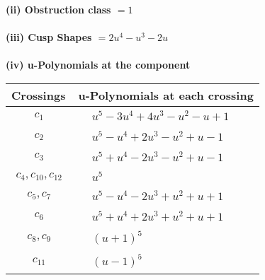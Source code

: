 \documentclass[1p]{elsarticle_modified}
\theoremstyle{definition}
\begin{document}
\flushleft \textbf{(ii) Obstruction class $= 1$}\\~\\
\flushleft \textbf{(iii) Cusp Shapes $= 2 u^4- u^3-2 u$}\\~\\
\newpage\renewcommand{\arraystretch}{1}
\flushleft \textbf{(iv) u-Polynomials at the component}\newline \\
\begin{tabular}{m{50pt}|m{274pt}}
Crossings & \hspace{64pt}u-Polynomials at each crossing \\
\hline $$\begin{aligned}c_{1}\end{aligned}$$&$\begin{aligned}
&u^5-3 u^4+4 u^3- u^2- u+1
\end{aligned}$\\
\hline $$\begin{aligned}c_{2}\end{aligned}$$&$\begin{aligned}
&u^5- u^4+2 u^3- u^2+u-1
\end{aligned}$\\
\hline $$\begin{aligned}c_{3}\end{aligned}$$&$\begin{aligned}
&u^5+u^4-2 u^3- u^2+u-1
\end{aligned}$\\
\hline $$\begin{aligned}c_{4},c_{10},c_{12}\end{aligned}$$&$\begin{aligned}
&u^5
\end{aligned}$\\
\hline $$\begin{aligned}c_{5},c_{7}\end{aligned}$$&$\begin{aligned}
&u^5- u^4-2 u^3+u^2+u+1
\end{aligned}$\\
\hline $$\begin{aligned}c_{6}\end{aligned}$$&$\begin{aligned}
&u^5+u^4+2 u^3+u^2+u+1
\end{aligned}$\\
\hline $$\begin{aligned}c_{8},c_{9}\end{aligned}$$&$\begin{aligned}
&(u+1)^5
\end{aligned}$\\
\hline $$\begin{aligned}c_{11}\end{aligned}$$&$\begin{aligned}
&(u-1)^5
\end{aligned}$\\
\hline
\end{tabular}\\~\\
\end{document}

